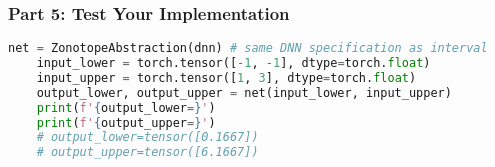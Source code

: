 \subsubsection{Part 5: Test Your Implementation}


\begin{lstlisting}[language=Python]
    net = ZonotopeAbstraction(dnn) # same DNN specification as interval
    input_lower = torch.tensor([-1, -1], dtype=torch.float)
    input_upper = torch.tensor([1, 3], dtype=torch.float)
    output_lower, output_upper = net(input_lower, input_upper)
    print(f'{output_lower=}')
    print(f'{output_upper=}')
    # output_lower=tensor([0.1667])
    # output_upper=tensor([6.1667])
\end{lstlisting}
